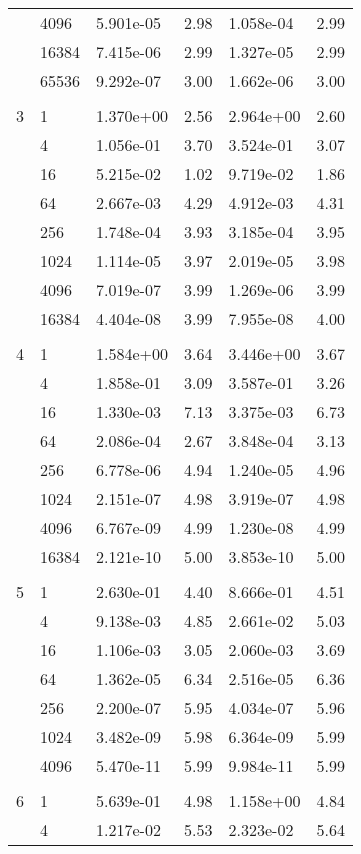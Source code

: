 \begin{table}[H]
\begin{center}
{\begin{tabular}{llllll}
  & 4096 & 5.901e-05 & 2.98 & 1.058e-04 & 2.99\\
  & 16384 & 7.415e-06 & 2.99 & 1.327e-05 & 2.99\\
  & 65536 & 9.292e-07 & 3.00 & 1.662e-06 & 3.00\\
&&&&& \\
3 & 1 & 1.370e+00 & 2.56 & 2.964e+00 & 2.60\\
  & 4 & 1.056e-01 & 3.70 & 3.524e-01 & 3.07\\
  & 16 & 5.215e-02 & 1.02 & 9.719e-02 & 1.86\\
  & 64 & 2.667e-03 & 4.29 & 4.912e-03 & 4.31\\
  & 256 & 1.748e-04 & 3.93 & 3.185e-04 & 3.95\\
  & 1024 & 1.114e-05 & 3.97 & 2.019e-05 & 3.98\\
  & 4096 & 7.019e-07 & 3.99 & 1.269e-06 & 3.99\\
  & 16384 & 4.404e-08 & 3.99 & 7.955e-08 & 4.00\\
&&&&& \\
4 & 1 & 1.584e+00 & 3.64 & 3.446e+00 & 3.67\\
  & 4 & 1.858e-01 & 3.09 & 3.587e-01 & 3.26\\
  & 16 & 1.330e-03 & 7.13 & 3.375e-03 & 6.73\\
  & 64 & 2.086e-04 & 2.67 & 3.848e-04 & 3.13\\
  & 256 & 6.778e-06 & 4.94 & 1.240e-05 & 4.96\\
  & 1024 & 2.151e-07 & 4.98 & 3.919e-07 & 4.98\\
  & 4096 & 6.767e-09 & 4.99 & 1.230e-08 & 4.99\\
  & 16384 & 2.121e-10 & 5.00 & 3.853e-10 & 5.00\\
&&&&& \\
5 & 1 & 2.630e-01 & 4.40 & 8.666e-01 & 4.51\\
  & 4 & 9.138e-03 & 4.85 & 2.661e-02 & 5.03\\
  & 16 & 1.106e-03 & 3.05 & 2.060e-03 & 3.69\\
  & 64 & 1.362e-05 & 6.34 & 2.516e-05 & 6.36\\
  & 256 & 2.200e-07 & 5.95 & 4.034e-07 & 5.96\\
  & 1024 & 3.482e-09 & 5.98 & 6.364e-09 & 5.99\\
  & 4096 & 5.470e-11 & 5.99 & 9.984e-11 & 5.99\\
&&&&& \\
6 & 1 & 5.639e-01 & 4.98 & 1.158e+00 & 4.84\\
  & 4 & 1.217e-02 & 5.53 & 2.323e-02 & 5.64\\

\end{tabular}}
\end{center}
\end{table}
